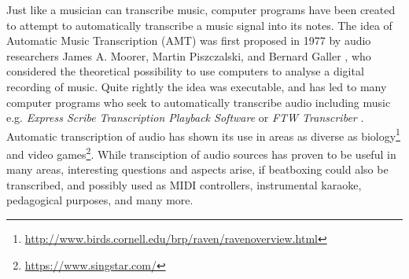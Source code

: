 
Just like a musician can transcribe music, computer programs have been created to attempt to automatically transcribe a music signal into its notes. The idea of Automatic Music Transcription (AMT) was first proposed in 1977 by audio researchers James A. Moorer, Martin Piszczalski, and Bernard Galler \citep{Scheirer1998}, who considered the theoretical possibility to use computers to analyse a digital recording of music. Quite rightly the idea was executable, and has led to many computer programs who seek to automatically transcribe audio including music e.g. \textit{ Express Scribe Transcription Playback Software } or \textit{ FTW Transcriber }. 
Automatic transcription of audio has shown its use in areas as diverse as biology\footnote{\url{http://www.birds.cornell.edu/brp/raven/ravenoverview.html}} and video games\footnote{\url{https://www.singstar.com/}}.
While transciption of audio sources has proven to be useful in many areas, interesting questions and aspects arise, if beatboxing could also be transcribed, and possibly used as MIDI controllers, instrumental karaoke, pedagogical purposes, and many more.




